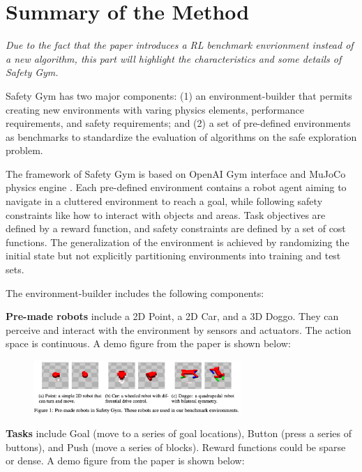 \documentclass{article}
\begin{document}
\section{Summary of the Method}

\textit{Due to the fact that the paper introduces a RL benchmark envrionment instead of a new algorithm, this part will highlight the characteristics and some details of Safety Gym.}

Safety Gym has two major components: (1) an environment-builder that permits creating new environments with varing physics elements, performance requirements, and safety requirements; and (2) a set of pre-defined environments as benchmarks to standardize the evaluation of algorithms on the safe exploration problem.

The framework of Safety Gym is based on OpenAI Gym \cite{brockman2016openai} interface and MuJoCo physics engine \cite{todorov2012mujoco}. Each pre-defined environment contains a robot agent aiming to navigate in a cluttered environment to reach a goal, while following safety constraints like how to interact with objects and areas. Task objectives are defined by a reward function, and safety constraints are defined by a set of cost functions. The generalization of the environment is achieved by randomizing the initial state but not explicitly partitioning environments into training and test sets.

The environment-builder includes the following components:

\textbf{Pre-made robots} include a 2D Point, a 2D Car, and a 3D Doggo. They can perceive and interact with the environment by sensors and actuators. The action space is continuous. A demo figure from the paper \cite{ray2019benchmarking} is shown below:

\begin{figure}[h]
    \centering
    \includegraphics[width=0.7\textwidth]{./pics/robots.png}
    \label{fig:doggo}
\end{figure}

\textbf{Tasks} include Goal (move to a series of goal locations), Button (press a series of buttons), and Push (move a series of blocks). Reward functions could be sparse or dense. A demo figure from the paper \cite{ray2019benchmarking} is shown below:
\end{document}

